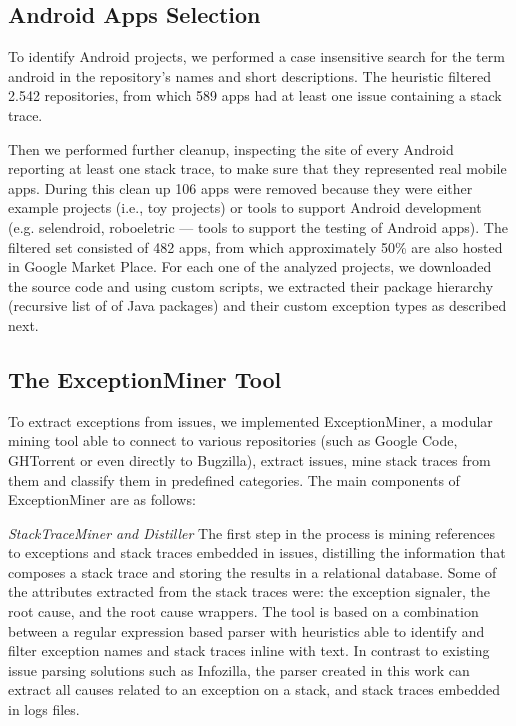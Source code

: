 \documentclass[conference]{IEEEtran}
\begin{document}
\subsection{Android Apps Selection}
\label{sec:android}

To identify Android projects, we performed a case insensitive search for the
term \textsf{android} in the repository's names and short descriptions.  The
heuristic filtered 2.542 repositories, from which 589 apps had at least one
issue containing a stack trace.

Then we performed further cleanup, inspecting the site of every Android
reporting at least one stack trace, to make sure that they represented real
mobile apps. During this clean up 106 apps were removed because they were either
example projects (i.e., toy projects) or tools to support Android development
(e.g. \textsf{selendroid}, \textsf{roboeletric} --- tools to support the testing of Android apps).
The filtered set consisted of 482 apps, from which approximately 50\% are also
hosted in Google Market Place. For each one of the analyzed projects, we
downloaded the source code and using custom scripts, we extracted their package
hierarchy (recursive list of of Java packages) and their custom exception types
as described next.

\subsection{The ExceptionMiner Tool}
\label{sec:exceptionminer}

To extract exceptions from issues, we implemented ExceptionMiner, a modular
mining tool able to connect to various repositories (such as Google Code,
GHTorrent or even directly to Bugzilla), extract issues, mine stack traces from
them and classify them in predefined categories. The main components of
ExceptionMiner are as follows:

\noindent\emph{StackTraceMiner and Distiller} The first step in the process is
mining references to exceptions and stack traces embedded in issues, distilling
the information that composes a stack trace and storing the results in a
relational database. Some of the attributes extracted from the stack traces were:
 the exception signaler, the root cause, and the root cause wrappers. 
The tool is based on a combination between a regular expression based parser 
with heuristics able to identify and filter exception names and stack traces inline with text. In
contrast to existing issue parsing solutions such as Infozilla, the parser
created in this work can extract all causes related to an exception on a stack,
and stack traces embedded in logs files.
\end{document}
